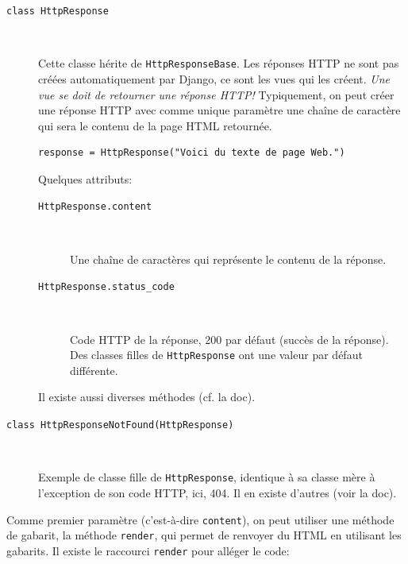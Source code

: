 \documentclass[a4paper, 10pt]{article}
\begin{document}
\begin{description}
    \item[\texttt{class HttpResponse}]~

          Cette classe hérite de \texttt{HttpResponseBase}. Les réponses HTTP ne sont pas créées automatiquement par Django, ce sont les vues qui les créent. \emph{Une vue se doit de retourner une réponse HTTP!} Typiquement, on peut créer une réponse HTTP avec comme unique paramètre une chaîne de caractère qui sera le contenu de la page HTML retournée.

          \begin{verbatim}
response = HttpResponse("Voici du texte de page Web.")
    \end{verbatim}

          Quelques attributs:

          \begin{description}
              \item[\texttt{HttpResponse.content}]~

                    Une chaîne de caractères qui représente le contenu de la réponse.

              \item[\texttt{HttpResponse.status_code}]~

                    Code HTTP de la réponse, 200 par défaut (succès de la réponse). Des classes filles de \texttt{HttpResponse} ont une valeur par défaut différente.
          \end{description}

          Il existe aussi diverses méthodes (cf. la doc).

    \item[\texttt{class HttpResponseNotFound(HttpResponse)}]~

          Exemple de classe fille de \texttt{HttpResponse}, identique à sa classe mère à l'exception de son code HTTP, ici, 404. Il en existe d'autres (voir la doc).
\end{description}

Comme  premier paramètre (c'est-à-dire \texttt{content}), on peut utiliser une méthode de gabarit, la méthode \texttt{render}, qui permet de renvoyer du HTML en utilisant les gabarits. Il existe le raccourci \texttt{render} pour alléger le code:
\end{document}
